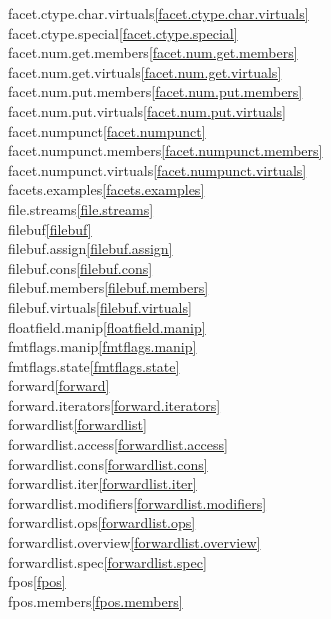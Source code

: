 \begin{multicols}{2}
facet.ctype.char.virtuals\quad\ref{facet.ctype.char.virtuals}\\
facet.ctype.special\quad\ref{facet.ctype.special}\\
facet.num.get.members\quad\ref{facet.num.get.members}\\
facet.num.get.virtuals\quad\ref{facet.num.get.virtuals}\\
facet.num.put.members\quad\ref{facet.num.put.members}\\
facet.num.put.virtuals\quad\ref{facet.num.put.virtuals}\\
facet.numpunct\quad\ref{facet.numpunct}\\
facet.numpunct.members\quad\ref{facet.numpunct.members}\\
facet.numpunct.virtuals\quad\ref{facet.numpunct.virtuals}\\
facets.examples\quad\ref{facets.examples}\\
file.streams\quad\ref{file.streams}\\
filebuf\quad\ref{filebuf}\\
filebuf.assign\quad\ref{filebuf.assign}\\
filebuf.cons\quad\ref{filebuf.cons}\\
filebuf.members\quad\ref{filebuf.members}\\
filebuf.virtuals\quad\ref{filebuf.virtuals}\\
floatfield.manip\quad\ref{floatfield.manip}\\
fmtflags.manip\quad\ref{fmtflags.manip}\\
fmtflags.state\quad\ref{fmtflags.state}\\
forward\quad\ref{forward}\\
forward.iterators\quad\ref{forward.iterators}\\
forwardlist\quad\ref{forwardlist}\\
forwardlist.access\quad\ref{forwardlist.access}\\
forwardlist.cons\quad\ref{forwardlist.cons}\\
forwardlist.iter\quad\ref{forwardlist.iter}\\
forwardlist.modifiers\quad\ref{forwardlist.modifiers}\\
forwardlist.ops\quad\ref{forwardlist.ops}\\
forwardlist.overview\quad\ref{forwardlist.overview}\\
forwardlist.spec\quad\ref{forwardlist.spec}\\
fpos\quad\ref{fpos}\\
fpos.members\quad\ref{fpos.members}\\

\end{multicols}
